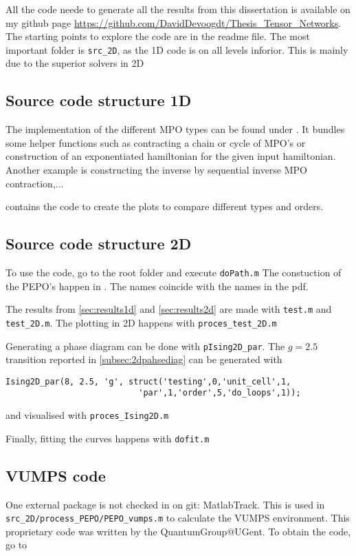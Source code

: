 
All the code neede to generate all the results from this dissertation is available on my github page \url{https://github.com/DavidDevoogdt/Thesis_Tensor_Networks}. The starting points to explore the code are in the readme file. The most important folder is \verb#src_2D#, as the 1D code is on all levels inforior. This is mainly due to the superior solvers in 2D

\subsection{Source code structure 1D}

The implementation of the different MPO types can be found under . It bundles some helper functions such as contracting a chain or cycle of MPO's or construction of an exponentiated hamiltonian for the given input hamiltonian. Another example is constructing the inverse by sequential inverse MPO contraction,...

 contains the code to create the plots to compare different types and orders.

\subsection{Source code structure 2D}

To use the code, go to the root folder and execute  \verb#doPath.m#
The constuction of the PEPO's happen in . The names coincide with the names in the pdf.

The results from \cref{sec:results1d} and \cref{sec:results2d} are made with  \verb#test.m# and \verb#test_2D.m#. The plotting in 2D happens with \verb#proces_test_2D.m#

Generating a phase diagram can be done with \verb#pIsing2D_par#. The $g=2.5$ transition reported in \cref{subsec:2dpahsediag} can be generated with
\begin{verbatim}
Ising2D_par(8, 2.5, 'g', struct('testing',0,'unit_cell',1,
                           'par',1,'order',5,'do_loops',1));
\end{verbatim}
and visualised with \verb#proces_Ising2D.m#

Finally, fitting the curves happens with \verb#dofit.m#

\subsection{VUMPS code}
One external package is not checked in on git: MatlabTrack. This is used in  \verb#src_2D/process_PEPO/PEPO_vumps.m# to calculate the VUMPS environment. This proprietary code was written by the QuantumGroup@UGent. To obtain the code, go to 
